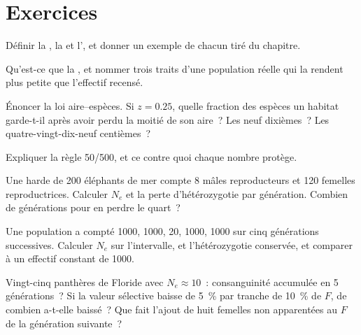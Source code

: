 \section{Exercices}

\begin{exercise}[$\star$]\label{exo:b3:conservation-biology:1}
Définir la , la  et l', et donner un exemple de chacun tiré
du chapitre.
\end{exercise}

\begin{exercise}[$\star$]\label{exo:b3:conservation-biology:2}
Qu'est-ce que la , et nommer trois traits
d'une population réelle qui la rendent plus petite que l'effectif
recensé.
\end{exercise}

\begin{exercise}[$\star$]\label{exo:b3:conservation-biology:3}
Énoncer la loi aire--espèces. Si $z = 0.25$, quelle fraction des espèces
un habitat garde-t-il après avoir perdu la moitié de son aire~? Les neuf
dixièmes~? Les quatre-vingt-dix-neuf centièmes~?
\end{exercise}

\begin{exercise}[$\star$]\label{exo:b3:conservation-biology:4}
Expliquer la règle 50/500, et ce contre quoi chaque nombre protège.
\end{exercise}

\begin{exercise}[$\star\star$]\label{exo:b3:conservation-biology:5}
Une harde de 200 éléphants de mer compte 8 mâles reproducteurs et 120
femelles reproductrices. Calculer $N_{e}$ et la perte d'hétérozygotie
par génération. Combien de générations pour en perdre le quart~?
\end{exercise}

\begin{exercise}[$\star\star$]\label{exo:b3:conservation-biology:6}
Une population a compté 1000, 1000, 20, 1000, 1000 sur cinq générations
successives. Calculer $N_{e}$ sur l'intervalle, et l'hétérozygotie
conservée, et comparer à un effectif constant de 1000.
\end{exercise}

\begin{exercise}[$\star\star$]\label{exo:b3:conservation-biology:7}
Vingt-cinq panthères de Floride avec $N_{e} \approx 10$~: consanguinité
accumulée en 5 générations~? Si la valeur sélective baisse de
\qty{5}{\%} par tranche de \qty{10}{\%} de $F$, de combien a-t-elle
baissé~? Que fait l'ajout de huit femelles non apparentées au $F$ de la
génération suivante~?
\end{exercise}

